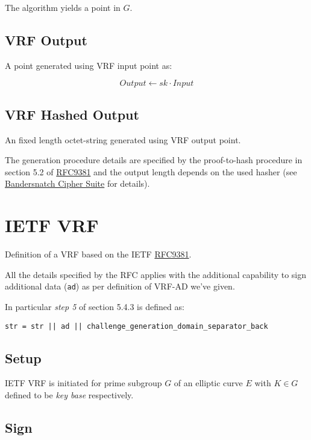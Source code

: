 \documentclass[
]{article}
\begin{document}
The algorithm yields a point in \(G\).

\hypertarget{vrf-output}{%
\subsection{VRF Output}\label{vrf-output}}

A point generated using VRF input point as:

\[Output \leftarrow sk \cdot Input\]

\hypertarget{vrf-hashed-output}{%
\subsection{VRF Hashed Output}\label{vrf-hashed-output}}

An fixed length octet-string generated using VRF output point.

The generation procedure details are specified by the proof-to-hash
procedure in section 5.2 of
\href{https://datatracker.ietf.org/doc/rfc9381/}{RFC9381} and the output
length depends on the used hasher (see
\protect\hyperlink{bandersnatch-cipher-suite}{Bandersnatch Cipher Suite}
for details).

\hypertarget{ietf-vrf}{%
\section{IETF VRF}\label{ietf-vrf}}

Definition of a VRF based on the IETF
\href{https://datatracker.ietf.org/doc/rfc9381/}{RFC9381}.

All the details specified by the RFC applies with the additional
capability to sign additional data (\texttt{ad}) as per definition of
VRF-AD we've given.

In particular \emph{step 5} of section 5.4.3 is defined as:

\begin{verbatim}
str = str || ad || challenge_generation_domain_separator_back
\end{verbatim}

\hypertarget{setup}{%
\subsection{Setup}\label{setup}}

IETF VRF is initiated for prime subgroup \(G\) of an elliptic curve
\(E\) with \(K \in G\) defined to be \emph{key base} respectively.

\hypertarget{sign}{%
\subsection{Sign}\label{sign}}
\end{document}
